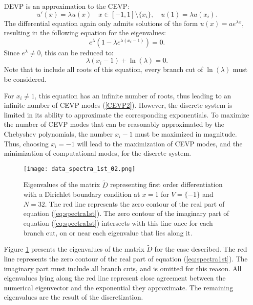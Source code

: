 \documentclass{sfuthesis}
\begin{document}
DEVP is an approximation to the CEVP:
\begin{equation} \label{CEVP2}
u'(x) = \lambda u(x) \quad x \in [-1, 1] \setminus \{x_i\}, \quad u(1) = \lambda u(x_i).
\end{equation}
The differential equation again only admits solutions of the form $u(x) = a e^{\lambda x}$, resulting in the following equation for the eigenvalues:
\begin{equation}
e^{\lambda} \left ( 1 - \lambda e^{\lambda (x_i - 1)} \right ) = 0.
\end{equation}
Since $e^{\lambda} \neq 0$, this can be reduced to:
\begin{equation} \label{eq:spectra1st}
\lambda (x_i - 1) + \ln(\lambda) = 0.
\end{equation}
Note that to include all roots of this equation, every branch cut of $\ln(\lambda)$ must be considered.

For $x_i \neq 1$, this equation has an infinite number of roots, thus leading to an infinite number of CEVP modes (\ref{CEVP2}).
However, the discrete system is limited in its ability to approximate the corresponding exponentials.
To maximize the number of CEVP modes that can be reasonably approximated by the Chebyshev polynomials, the number $x_i -1$ must be maximized in magnitude.
Thus, choosing $x_i = -1$ will lead to the maximization of CEVP modes, and the minimization of computational modes, for the discrete system.

\begin{figure}
\texttt{[image: data\_spectra\_1st\_02.png]}
\caption{Eigenvalues of the matrix $\tilde{D}$ representing first order differentiation with a Dirichlet boundary condition at $x=1$ for $V = \{ -1 \}$ and $N = 32$.
The red line represents the zero contour of the real part of equation (\ref{eq:spectra1st}).
The zero contour of the imaginary part of equation (\ref{eq:spectra1st}) intersects with this line once for each branch cut,
 on or near each eigenvalue that lies along it.}
\label{fig:Spectra1st_02}
\end{figure}

Figure \ref{fig:Spectra1st_02} presents the eigenvalues of the matrix $\tilde{D}$ for the case described.
The red line represents the zero contour of the real part of equation (\ref{eq:spectra1st}).
The imaginary part must include all branch cuts, and is omitted for this reason.
All eigenvalues lying along the red line represent close agreement between the numerical eigenvector and the exponential they approximate.
The remaining eigenvalues are the result of the discretization.
\end{document}
